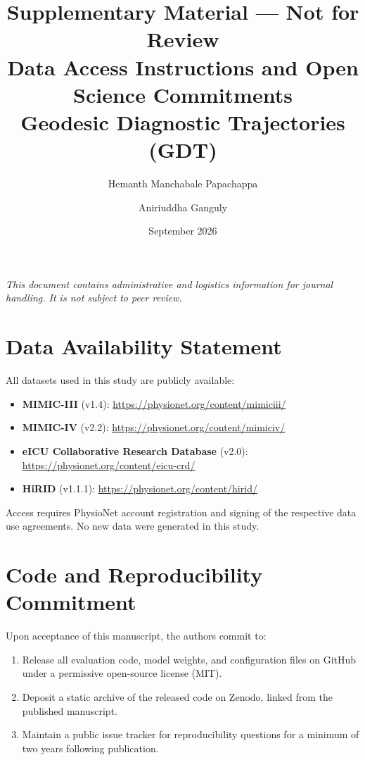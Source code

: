\documentclass[11pt]{article}
\title{Supplementary Material --- Not for Review\\
\large Data Access Instructions and Open Science Commitments\\
Geodesic Diagnostic Trajectories (GDT)}
\author{Hemanth Manchabale Papachappa \and Aniriuddha Ganguly}
\date{September 2026}
\begin{document}
\maketitle

\noindent\textit{This document contains administrative and logistics information
for journal handling. It is not subject to peer review.}

\bigskip

\section{Data Availability Statement}

All datasets used in this study are publicly available:

\begin{itemize}
  \item \textbf{MIMIC-III} (v1.4): \url{https://physionet.org/content/mimiciii/}
  \item \textbf{MIMIC-IV} (v2.2): \url{https://physionet.org/content/mimiciv/}
  \item \textbf{eICU Collaborative Research Database} (v2.0):
        \url{https://physionet.org/content/eicu-crd/}
  \item \textbf{HiRID} (v1.1.1): \url{https://physionet.org/content/hirid/}
\end{itemize}

Access requires PhysioNet account registration and signing of the respective
data use agreements. No new data were generated in this study.

\section{Code and Reproducibility Commitment}

Upon acceptance of this manuscript, the authors commit to:

\begin{enumerate}
  \item Release all evaluation code, model weights, and configuration files on
        GitHub under a permissive open-source license (MIT).
  \item Deposit a static archive of the released code on Zenodo, linked from the
        published manuscript.
  \item Maintain a public issue tracker for reproducibility questions for a
        minimum of two years following publication.
\end{enumerate}
\end{document}
